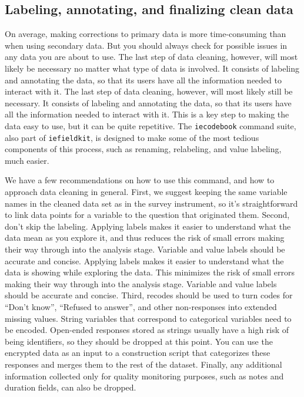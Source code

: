 \subsection{Labeling, annotating, and finalizing clean data}
On average, making corrections to primary data is more time-consuming than when using secondary data.
But you should always check for possible issues in any data you are about to use.
The last step of data cleaning, however,
will most likely be necessary no matter what type of data is involved.
It consists of labeling and annotating the data,
so that its users have all the information needed to interact with it.
The last step of data cleaning, however, will most likely still be necessary.
It consists of labeling and annotating the data, so that its users have all the
information needed to interact with it.
This is a key step to making the data easy to use, but it can be quite repetitive.
The \texttt{iecodebook} command suite, also part of \texttt{iefieldkit},
is designed to make some of the most tedious components of this process,
such as renaming, relabeling, and value labeling, much easier.

We have a few recommendations on how to use this command,
and how to approach data cleaning in general.
First, we suggest keeping the same variable names in the cleaned data set as in the survey instrument,
so it's straightforward to link data points for a variable to the question that originated them.
Second, don't skip the labeling.
Applying labels makes it easier to understand what the data mean as you explore it,
and thus reduces the risk of small errors making their way through into the analysis stage.
Variable and value labels should be accurate and concise.
Applying labels makes it easier to understand what the data is showing while exploring the data.
This minimizes the risk of small errors making their way through into the analysis stage.
Variable and value labels should be accurate and concise.
Third, recodes should be used to turn codes for ``Don't know'', ``Refused to answer'', and
other non-responses into extended missing values.
String variables that correspond to categorical variables need to be encoded.
Open-ended responses stored as strings usually have a high risk of being identifiers,
so they should be dropped at this point.
You can use the encrypted data as an input to a construction script
that categorizes these responses and merges them to the rest of the dataset.
Finally, any additional information collected only for quality monitoring purposes,
such as notes and duration fields, can also be dropped.

